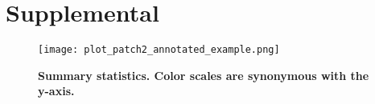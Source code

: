 

\clearpage

\beginsupplement
\section{Supplemental} \label{Supplemental_text}

\begin{figure}[ht]
    \centering
    \texttt{[image: plot\_patch2\_annotated\_example.png]}    
\caption{\textbf{Summary statistics. Color scales are synonymous with the y-axis.} }
    \label{fig:summary_stats}
\end{figure}


